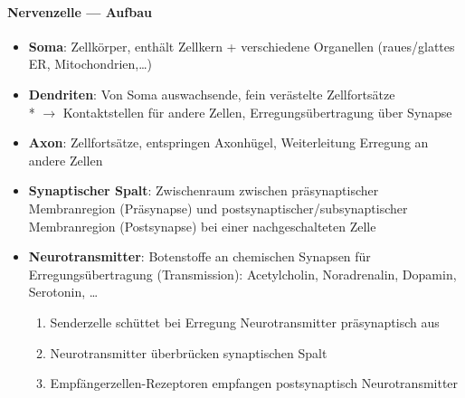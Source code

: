 \paragraph{Nervenzelle --- Aufbau}
\begin{itemize}
  \item \textbf{Soma}: Zellkörper, enthält Zellkern + verschiedene Organellen (raues/glattes ER, Mitochondrien,\dots)
  \item \textbf{Dendriten}: Von Soma auswachsende, fein verästelte Zellfortsätze \\* \( \to \) Kontaktstellen für andere Zellen, Erregungsübertragung über Synapse
  \item \textbf{Axon}: Zellfortsätze, entspringen Axonhügel, Weiterleitung Erregung an andere Zellen
  \item \textbf{Synaptischer Spalt}: Zwischenraum zwischen präsynaptischer Membranregion (Präsynapse) und postsynaptischer/subsynaptischer Membranregion (Postsynapse) bei einer nachgeschalteten Zelle
  \item \textbf{Neurotransmitter}: Botenstoffe an chemischen Synapsen für Erregungsübertragung (Transmission): Acetylcholin, Noradrenalin, Dopamin, Serotonin, \dots
  \begin{enumerate}
    \item Senderzelle schüttet bei Erregung Neurotransmitter präsynaptisch aus
    \item Neurotransmitter überbrücken synaptischen Spalt
    \item Empfängerzellen-Rezeptoren empfangen postsynaptisch Neurotransmitter
  \end{enumerate}
\end{itemize}

